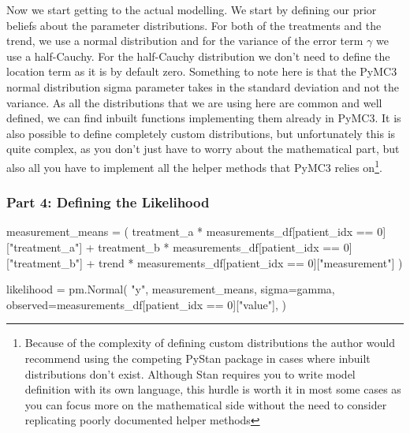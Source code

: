 \documentclass[12pt,a4paper,leqno]{report}
\theoremstyle{plain}
\theoremstyle{definition}
\theoremstyle{remark}
\begin{document}
Now we start getting to the actual modelling. We start by defining our prior beliefs about
the parameter distributions. For both of the treatments and the trend, we use a normal distribution and
for the variance of the error term \(\gamma \) we use a half-Cauchy. For the half-Cauchy
distribution we don't need to define the location term as it is by default zero.
Something to note here is that the PyMC3 normal distribution sigma
parameter takes in the standard deviation and not the variance. As all the distributions
that we are using here are common and well defined, we can find inbuilt functions implementing
them already in PyMC3. It is also possible to define completely custom
distributions, but unfortunately this is quite complex, as you don't just have to worry
about the mathematical part, but also all you have to implement all the helper methods that PyMC3
relies on\footnote{Because of the complexity of defining
custom distributions the author would recommend using the competing PyStan package in
cases where inbuilt distributions don't exist. Although Stan requires you to write
model definition with its own language, this hurdle is worth it in most some cases as you can focus
more on the mathematical side without the need to consider replicating poorly documented helper methods}.

\subsubsection*{Part 4: Defining the Likelihood}

\bigskip
\begin{pyverbatim}[][fontsize=\footnotesize]
    measurement_means = (
        treatment_a
        * measurements_df[patient_idx == 0]["treatment_a"]
        + treatment_b
        * measurements_df[patient_idx == 0]["treatment_b"]
        + trend
        * measurements_df[patient_idx == 0]["measurement"]
    )

    likelihood = pm.Normal(
        "y",
        measurement_means,
        sigma=gamma,
        observed=measurements_df[patient_idx == 0]["value"],
    )
\end{pyverbatim}
\smallskip
\end{document}
